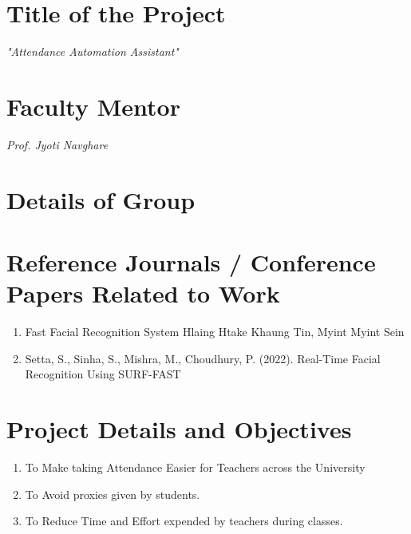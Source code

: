 \documentclass[11pt]{article}
\begin{document}
\tableofcontents
\thispagestyle{empty}
\clearpage


\setcounter{page}{1}

\section{Title of the Project}
\textit{\Large{"Attendance Automation Assistant"}}

\section{Faculty Mentor}
\textit{\Large{Prof. Jyoti Navghare}}

\section{Details of Group}


\begin{table}[H]
	\centering
	\label{tab:my-table}
\end{table}

\section{Reference Journals / Conference Papers Related to Work}
\begin{enumerate}
    \item Fast Facial Recognition System
    Hlaing Htake Khaung Tin, Myint Myint Sein \cite{1}
    \item Setta, S., Sinha, S., Mishra, M., Choudhury, P. (2022). Real-Time Facial Recognition Using SURF-FAST \cite{2}
\end{enumerate}


\section{Project Details and Objectives}
\begin{enumerate}
    \item To Make taking Attendance Easier for Teachers across the University
    \item To Avoid proxies given by students. 
    \item To Reduce Time and Effort expended by teachers during classes. 
\end{enumerate}
\end{document}

